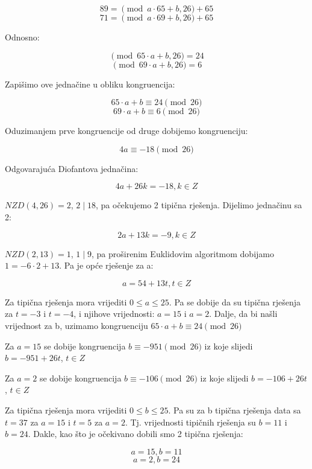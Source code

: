 \documentclass[12pt]{article}
\begin{document}
$$89 = \pmod{a\cdot65 + b, 26} + 65$$ 
$$71 = \pmod{a\cdot69 + b, 26} + 65$$

Odnosno:

$$\pmod{65\cdot a + b, 26} = 24$$
$$\pmod{69\cdot a + b, 26} = 6$$\vspace{1mm}

Zapišimo ove jednačine u obliku kongruencija:

$$65\cdot a + b \equiv 24 \pmod{26}$$
$$69\cdot a + b \equiv 6 \pmod{26}$$\vspace{1mm}

Oduzimanjem prve kongruencije od druge dobijemo kongruenciju:

$$4a \equiv -18\pmod{26}$$\vspace{1mm}

Odgovarajuća Diofantova jednačina:

$$4a + 26k = -18, k \in Z$$\vspace{1mm} 

$NZD(4, 26) = 2$, $2 \mid 18$, pa očekujemo 2 tipična rješenja. Dijelimo jednačinu sa 2:

$$2a + 13k = -9, k \in Z$$\vspace{1mm}

$NZD(2, 13) = 1$, $1 \mid 9$, pa proširenim Euklidovim algoritmom dobijamo $1 = -6\cdot 2 + 13$. Pa je opće rješenje za a:

$$a = 54 + 13t, t \in Z$$\vspace{1mm}

Za tipična rješenja mora vrijediti $0 \leq a \leq 25$. Pa se dobije da su tipična rješenja za $t = -3$ i $t = -4$, i njihove vrijednosti: $a = 15$ i $a = 2$.
Dalje, da bi našli vrijednost za b, uzimamo kongruenciju $65\cdot a + b \equiv 24 \pmod{26}$\vspace{1mm}

Za $a = 15$ se dobije kongruencija $b \equiv -951 \pmod{26}$ iz koje slijedi $b = -951 + 26t$, $t \in Z$

Za $a = 2$ se dobije kongruencija $b \equiv -106 \pmod{26}$ iz koje slijedi $b = -106 + 26t$, $t \in Z$\vspace{1mm}

Za tipična rješenja mora vrijediti $0 \leq b \leq 25$. Pa su za b tipična rješenja data sa $t = 37$ za $a = 15$ i $t = 5$ za $a = 2$.  Tj. vrijednosti tipičnih rješenja su $b = 11$ i $b = 24$. Dakle, kao što je očekivano dobili smo 2 tipična rješenja: 

$$a = 15, b = 11$$
$$a = 2, b = 24$$\vspace{1mm}
\end{document}
